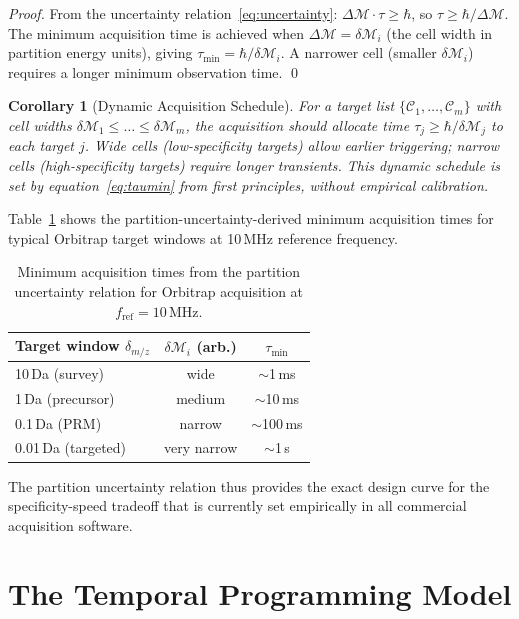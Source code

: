 \documentclass[twocolumn,10pt,a4paper]{article}
\theoremstyle{thmstyle}
\newtheorem{corollary}[theorem]{Corollary}
\theoremstyle{definition}
\theoremstyle{remark}
\newcommand{\calC}{\mathcal{C}}
\newcommand{\Mop}{\mathcal{M}}
\begin{document}
\begin{proof}
From the uncertainty relation~\eqref{eq:uncertainty}:
$\Delta\Mop \cdot \tau \geq \hbar$, so
$\tau \geq \hbar/\Delta\Mop$. The minimum acquisition time is achieved
when $\Delta\Mop = \delta\Mop_i$ (the cell width in partition energy
units), giving $\tau_{\min} = \hbar/\delta\Mop_i$. A narrower cell
(smaller $\delta\Mop_i$) requires a longer minimum observation time.
\qed
\end{proof}

\begin{corollary}[Dynamic Acquisition Schedule]
\label{cor:dynamic}
For a target list $\{\calC_1, \ldots, \calC_m\}$ with cell widths
$\delta\Mop_1 \leq \ldots \leq \delta\Mop_m$, the acquisition should
allocate time $\tau_j \geq \hbar/\delta\Mop_j$ to each target $j$.
Wide cells (low-specificity targets) allow earlier triggering; narrow
cells (high-specificity targets) require longer transients. This
dynamic schedule is set by equation~\eqref{eq:taumin} from first
principles, without empirical calibration.
\end{corollary}

Table~\ref{tab:resolution} shows the partition-uncertainty-derived minimum
acquisition times for typical Orbitrap target windows at 10\,MHz
reference frequency.

\begin{table}[h]
\centering
\caption{Minimum acquisition times from the partition uncertainty relation
for Orbitrap acquisition at $f_{\text{ref}} = 10$\,MHz.}
\label{tab:resolution}
\small
\begin{tabular}{lcc}
\toprule
Target window $\delta_{m/z}$ & $\delta\Mop_i$ (arb.) & $\tau_{\min}$ \\
\midrule
10\,Da (survey) & wide & $\sim$1\,ms \\
1\,Da (precursor) & medium & $\sim$10\,ms \\
0.1\,Da (PRM) & narrow & $\sim$100\,ms \\
0.01\,Da (targeted) & very narrow & $\sim$1\,s \\
\bottomrule
\end{tabular}
\end{table}

The partition uncertainty relation thus provides the exact design curve
for the specificity-speed tradeoff that is currently set empirically in
all commercial acquisition software.

\section{The Temporal Programming Model}
\label{sec:tp}
\end{document}
